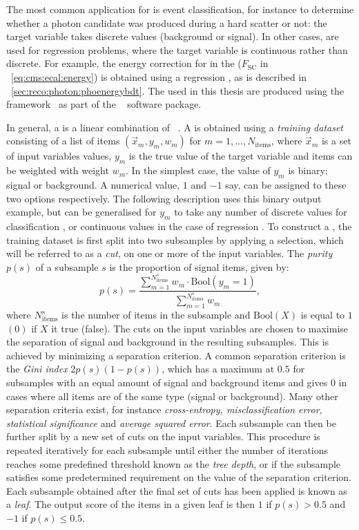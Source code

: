 The most common application for \BDT\s is event classification, for instance to determine whether a photon candidate was produced during a hard scatter or not: the target variable takes discrete values (background or signal). In other cases, \BDT\s are used for regression problems, where the target variable is continuous rather than discrete. For example, the energy correction for \SC\s in the \ECAL ($F_{\text{SC}}$ in \Eq~\ref{eq:cms:ecal:energy}) is obtained using a regression \BDT, as is described in \Sec~\ref{sec:reco:photon:phoenergybdt}. The \BDT\s used in this thesis are produced using the \TMVA framework~\cite{TMVA} as part of the \ROOT~\cite{root} software package. 

In general, a \BDT is a linear combination of \DT\s~\cite{friedman2009}. A \DT is obtained using a \emph{training dataset} consisting of a list of items $(\vec{x}_{m},y_{m},w_{m})$ for $m=1,...,N_{\textrm{items}}$, where $\vec{x}_{m}$ is a set of input variables values, $y_{m}$ is the true value of the target variable and items can be weighted with weight $w_{m}$. In the simplest case, the value of $y_{m}$ is binary: signal or background. A numerical value, $1$ and $-1$ say, can be assigned to these two options respectively. The following description uses this binary output example, but can be generalised for $y_{m}$ to take any number of discrete values for classification \DT\s, or continuous values in the case of regression \DT\s.
To construct a \DT, the training dataset is first split into two subsamples by applying a selection, which will be referred to as a \emph{cut}, on one or more of the input variables. The \emph{purity} $p(s)$ of a subsample $s$ is the proportion of signal items, given by:
\begin{equation}
 p(s) = \frac{\sum_{m=1}^{N_{\textrm{items}}^{s}} w_{m} \cdot \textrm{Bool}(y_m=1)}{\sum_{m=1}^{N_{\textrm{items}}^{s}} w_{m}}, 
\end{equation}
where $N_{\textrm{items}}^{s}$ is the number of items in the subsample and $\textrm{Bool}(X)$ is equal to $1$ $(0)$ if $X$ it true (false). 
The cuts on the input variables are chosen to maximise the separation of signal and background in the resulting subsamples. This is achieved by minimizing a separation criterion. 
A common separation criterion is the \emph{Gini index} $2p(s)(1-p(s))$, which has a maximum at $0.5$ for subsamples with an equal amount of signal and background items and gives $0$ in cases where all items are of the same type (signal or background). Many other separation criteria exist, for instance \emph{cross-entropy, misclassification error, statistical significance} and \emph{average squared error}.
Each subsample can then be further split by a new set of cuts on the input variables. This procedure is repeated iteratively for each subsample until either the number of iterations reaches some predefined threshold known as the \emph{tree depth}, or if the subsample satisfies some predetermined requirement on the value of the separation criterion. Each subsample obtained after the final set of cuts has been applied is known as a \emph{leaf}. The output score of the items in a given leaf is then $1 $ if $p(s)>0.5$ and $-1$ if $p(s)\leq0.5$.


